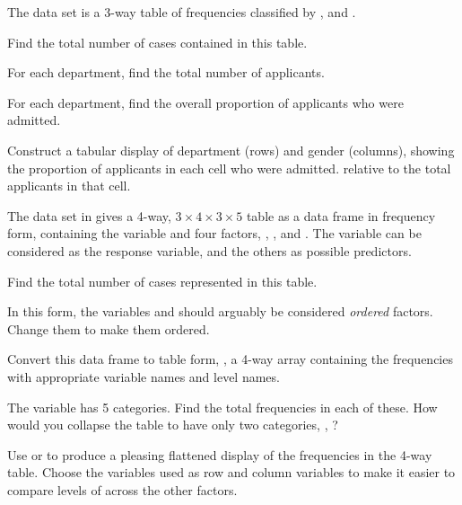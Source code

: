 \documentclass[10pt,krantz2]{krantz}\usepackage[]{graphicx}\usepackage[]{color}
\begin{document}
\begin{Exercises}
\exercise The data set  is a 3-way table of frequencies
classified by ,  and .
  \begin{enumerate*}
    \item Find the total number of cases contained in this table.
    \item For each department, find the total number of applicants.
    \item For each department, find the overall proportion of applicants who were admitted.
    \item Construct a tabular display of department (rows) and gender (columns), showing
    the proportion of applicants in each cell who were admitted.
    relative to the total applicants in that cell.
  \end{enumerate*}

\exercise The data set  in  
gives a 4-way, $3 \times 4 \times 3 \times 5$ 
table as a data frame in
frequency form, containing the variable  and four factors,
,
,
 and
.  The variable  can be considered as the
response variable, and the others as possible predictors.

  \begin{enumerate*}
    \item Find the total number of cases represented in this table.
    \item In this form, the variables  and 
    should arguably be considered \emph{ordered} factors.  Change them
    to make them ordered.
    \item Convert this data frame to table form, ,
    a 4-way array containing the
    frequencies with appropriate variable names and level names.
    \item The variable  has 5 categories.  Find the total frequencies
    in each of these.  How would you collapse the table to have only
    two categories, , ?
    \item Use  or  to produce a pleasing
    flattened display of the frequencies in the 4-way table.  Choose the
    variables used as row and column variables to make it easier to compare
    levels of  across the other factors.
  \end{enumerate*}


\end{Exercises}
\end{document}
